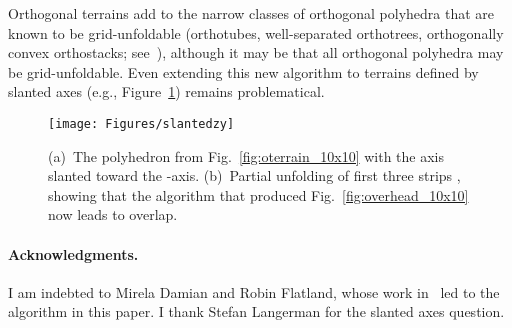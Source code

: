 \pdfoutput=1  \documentclass[]{article}
\newcommand{\figlab}[1]{\label{fig:#1}}
\newcommand{\figref}[1]{\ref{fig:#1}}
\begin{document}
Orthogonal terrains add to the narrow classes of orthogonal polyhedra
that are known to be grid-unfoldable
(orthotubes, 
well-separated orthotrees,
orthogonally convex orthostacks; see~\cite{o-uop-07}),
although
it may be that all orthogonal polyhedra may be grid-unfoldable.
Even extending this new algorithm to terrains defined by slanted axes
(e.g., Figure~\figref{slantedzy})
remains problematical.
\begin{figure}[htbp]
\centering
\texttt{[image: Figures/slantedzy]}
\caption{(a)~The polyhedron from Fig.~\protect\figref{oterrain_10x10}
with the  axis slanted  toward the -axis.
(b)~Partial unfolding of first three strips 
, showing that the algorithm 
that produced Fig.~\protect\figref{overhead_10x10}
now leads to overlap.
}
\figlab{slantedzy}
\end{figure}


\paragraph{Acknowledgments.}
I am indebted to
Mirela Damian and Robin Flatland, whose work in~\cite{dfo-umt-05}
led to the algorithm in this paper.
I thank Stefan Langerman for the slanted axes question.





\end{document}
